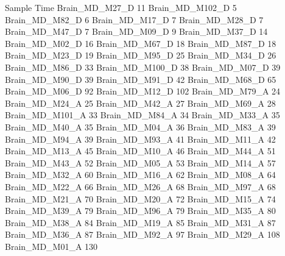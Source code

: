 Sample	Time
Brain_MD_M27_D	11
Brain_MD_M102_D	5
Brain_MD_M82_D	6
Brain_MD_M17_D	7
Brain_MD_M28_D	7
Brain_MD_M47_D	7
Brain_MD_M09_D	9
Brain_MD_M37_D	14
Brain_MD_M02_D	16
Brain_MD_M67_D	18
Brain_MD_M87_D	18
Brain_MD_M23_D	19
Brain_MD_M95_D	25
Brain_MD_M34_D	26
Brain_MD_M86_D	33
Brain_MD_M100_D	38
Brain_MD_M07_D	39
Brain_MD_M90_D	39
Brain_MD_M91_D	42
Brain_MD_M68_D	65
Brain_MD_M06_D	92
Brain_MD_M12_D	102
Brain_MD_M79_A	24
Brain_MD_M24_A	25
Brain_MD_M42_A	27
Brain_MD_M69_A	28
Brain_MD_M101_A	33
Brain_MD_M84_A	34
Brain_MD_M33_A	35
Brain_MD_M40_A	35
Brain_MD_M04_A	36
Brain_MD_M83_A	39
Brain_MD_M94_A	39
Brain_MD_M93_A	41
Brain_MD_M11_A	42
Brain_MD_M13_A	45
Brain_MD_M10_A	46
Brain_MD_M44_A	51
Brain_MD_M43_A	52
Brain_MD_M05_A	53
Brain_MD_M14_A	57
Brain_MD_M32_A	60
Brain_MD_M16_A	62
Brain_MD_M08_A	64
Brain_MD_M22_A	66
Brain_MD_M26_A	68
Brain_MD_M97_A	68
Brain_MD_M21_A	70
Brain_MD_M20_A	72
Brain_MD_M15_A	74
Brain_MD_M39_A	79
Brain_MD_M96_A	79
Brain_MD_M35_A	80
Brain_MD_M38_A	84
Brain_MD_M19_A	85
Brain_MD_M31_A	87
Brain_MD_M36_A	87
Brain_MD_M92_A	97
Brain_MD_M29_A	108
Brain_MD_M01_A	130
